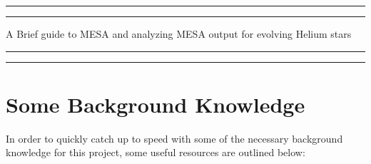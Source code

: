 \documentclass[12pt,hidelinks]{article}
\begin{document}
\begin{titlepage}
	\centering %
	\scshape %
	\vspace*{12\baselineskip} %

	\rule{13cm}{1.6pt}\vspace*{-\baselineskip}\vspace*{2pt} %
	\rule{13cm}{0.4pt} %
	
		\vspace{0.75\baselineskip} %
	{	\Huge A Brief guide to MESA and analyzing MESA output for evolving Helium stars\\ 
			\vspace{4mm}
	}
		\vspace{0.75\baselineskip} %
	\rule{13cm}{0.4pt}\vspace*{-\baselineskip}\vspace{3.2pt} %
	\rule{13cm}{1.6pt} %
	
		\vspace{1.75\baselineskip} %
	\vfill
\end{titlepage}
\tableofcontents
\vfill

\newpage
{}
\section{Some Background Knowledge }
\vspace{10.5cm}
	In order to quickly catch up to speed with some of the necessary background knowledge for this project, some useful resources are outlined below:
	
\end{document}

